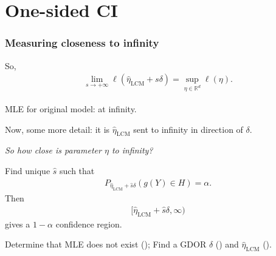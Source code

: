 \documentclass[ 10pt]{beamer}
\def\RR{{\mathbb R}}
\newcommand{\etaLCM}{\hat{\eta}_{\textrm{LCM}}}
\begin{document}
\section{One-sided CI}
\frame
{
  \frametitle{Measuring closeness to infinity}  
So,
\begin{align*}
	\lim_{s \to +\infty} \ell(\etaLCM + s\delta) = \sup_{\eta \in \RR^d} \ell(\eta).
\end{align*}	

MLE for original model: at infinity.

Now, some more detail: it is $\etaLCM$ sent to infinity in direction of $\delta$.
\vspace{2mm}


\emph{So how close is \alert{parameter} $\eta$ to infinity?  }
\vspace{2mm}

\pause
Find unique $\hat{s}$ such that
\begin{align*}
		P_{\etaLCM + \hat{s} \delta}( g(Y) \in H) = \alpha.
\end{align*}
Then
\begin{align*}
[ \etaLCM + \hat{s} \delta, \infty)
\end{align*}
gives a $1 - \alpha$ confidence region.
\vspace{2mm}

\pause
\begin{block}{}
Determine that MLE does not exist (\checkmark); Find a GDOR $\delta$ (\checkmark) and $\etaLCM$ (\checkmark).
\end{block}
}

%
%
\end{document}
